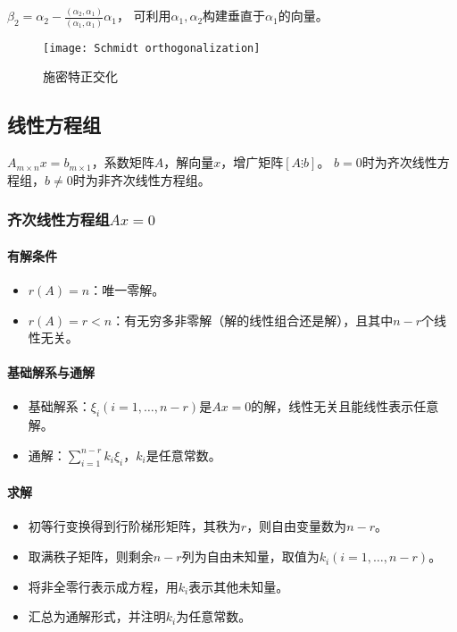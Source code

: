 \documentclass[
12pt, %
a4paper, 
oneside, %
headinclude,footinclude, %
]{scrartcl}
\begin{document}
$ \beta_2 = \alpha_2 - \frac{(\alpha_2, \alpha_1)}{(\alpha_1, \alpha_1)}\alpha_1 $，
可利用$ \alpha_1,\alpha_2 $构建垂直于$ \alpha_1 $的向量。

\begin{figure}[H]
\centering 
\texttt{[image: Schmidt orthogonalization]} 
\caption[施密特正交化]{施密特正交化}
\end{figure}
\subsection{线性方程组}
$ A_{m \times n}x = b_{m \times 1} $，系数矩阵$ A $，解向量$ x $，增广矩阵$ [A \vdots b] $。
$ b = 0 $时为齐次线性方程组，$ b \neq 0 $时为非齐次线性方程组。
\subsubsection{齐次线性方程组$ Ax = 0 $}
\paragraph{有解条件}
\begin{itemize}
\item $ r(A) = n $：唯一零解。
\item $ r(A) = r < n $：有无穷多非零解（解的线性组合还是解），且其中$ n - r $个线性无关。
\end{itemize}
\paragraph{基础解系与通解}
\begin{itemize}
\item 基础解系：$ \xi_i(i = 1, \dots, n - r) $是$ Ax = 0 $的解，线性无关且能线性表示任意解。
\item 通解：$ \sum_{i = 1}^{n - r} k_i \xi_i $，$ k_i $是任意常数。
\end{itemize}
\paragraph{求解}
\begin{itemize}
\item 初等行变换得到行阶梯形矩阵，其秩为$ r $，则自由变量数为$ n - r $。
\item 取满秩子矩阵，则剩余$ n - r $列为自由未知量，取值为$ k_i(i = 1, \dots, n - r) $。
\item 将非全零行表示成方程，用$ k_i $表示其他未知量。
\item 汇总为通解形式，并注明$ k_i $为任意常数。
\end{itemize}
\end{document}
